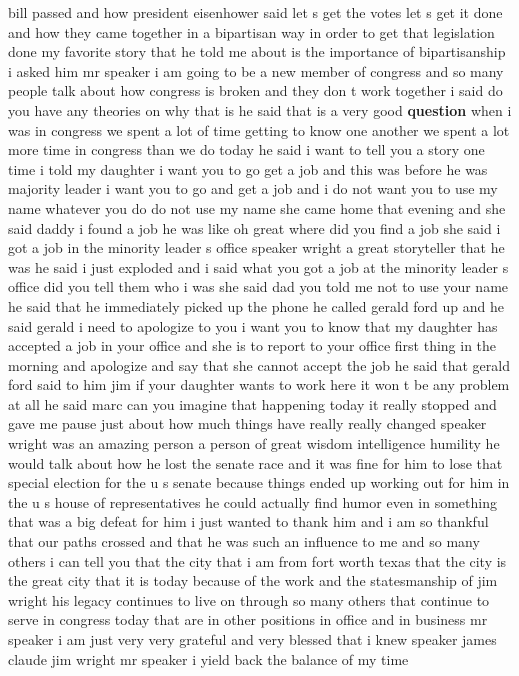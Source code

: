\documentclass{article}
\begin{document}
bill passed and how president eisenhower said let s get the votes let s get it done and how they came together in a bipartisan way in order to get that legislation done my favorite story that he told me about is the importance of bipartisanship i asked him mr speaker i am going to be a new member of congress and so many people talk about how congress is broken and they don t work together i said do you have any theories on why that is he said that is a very good {\bf \color{red} question} when i was in congress we spent a lot of time getting to know one another we spent a lot more time in congress than we do today he said i want to tell you a story one time i told my daughter i want you to go get a job and this was before he was majority leader i want you to go and get a job and i do not want you to use my name whatever you do do not use my name she came home that evening and she said daddy i found a job he was like oh great where did you find a job she said i got a job in the minority leader s office speaker wright a great storyteller that he was he said i just exploded and i said what you got a job at the minority leader s office did you tell them who i was she said dad you told me not to use your name he said that he immediately picked up the phone he called gerald ford up and he said gerald i need to apologize to you i want you to know that my daughter has accepted a job in your office and she is to report to your office first thing in the morning and apologize and say that she cannot accept the job he said that gerald ford said to him jim if your daughter wants to work here it won t be any problem at all he said marc can you imagine that happening today it really stopped and gave me pause just about how much things have really really changed speaker wright was an amazing person a person of great wisdom intelligence humility he would talk about how he lost the senate race and it was fine for him to lose that special election for the u s senate because things ended up working out for him in the u s house of representatives he could actually find humor even in something that was a big defeat for him i just wanted to thank him and i am so thankful that our paths crossed and that he was such an influence to me and so many others i can tell you that the city that i am from fort worth texas that the city is the great city that it is today because of the work and the statesmanship of jim wright his legacy continues to live on through so many others that continue to serve in congress today that are in other positions in office and in business mr speaker i am just very very grateful and very blessed that i knew speaker james claude jim wright mr speaker i yield back the balance of my time
\end{document}
